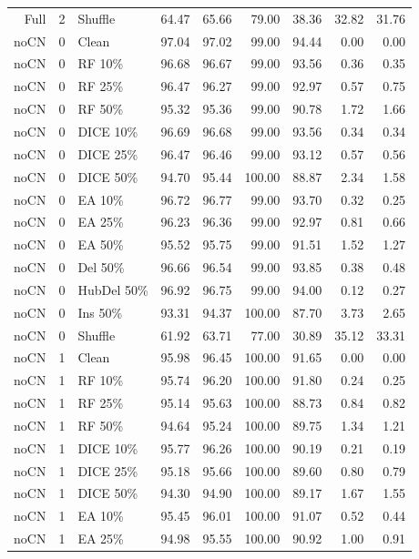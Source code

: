 {\begin{longtable}{rllrrrrrr}
Full & 2 & Shuffle & 64.47 & 65.66 & 79.00 & 38.36 & 32.82 & 31.76 \\
noCN & 0 & Clean & 97.04 & 97.02 & 99.00 & 94.44 & 0.00 & 0.00 \\
noCN & 0 & RF 10\% & 96.68 & 96.67 & 99.00 & 93.56 & 0.36 & 0.35 \\
noCN & 0 & RF 25\% & 96.47 & 96.27 & 99.00 & 92.97 & 0.57 & 0.75 \\
noCN & 0 & RF 50\% & 95.32 & 95.36 & 99.00 & 90.78 & 1.72 & 1.66 \\
noCN & 0 & DICE 10\% & 96.69 & 96.68 & 99.00 & 93.56 & 0.34 & 0.34 \\
noCN & 0 & DICE 25\% & 96.47 & 96.46 & 99.00 & 93.12 & 0.57 & 0.56 \\
noCN & 0 & DICE 50\% & 94.70 & 95.44 & 100.00 & 88.87 & 2.34 & 1.58 \\
noCN & 0 & EA 10\% & 96.72 & 96.77 & 99.00 & 93.70 & 0.32 & 0.25 \\
noCN & 0 & EA 25\% & 96.23 & 96.36 & 99.00 & 92.97 & 0.81 & 0.66 \\
noCN & 0 & EA 50\% & 95.52 & 95.75 & 99.00 & 91.51 & 1.52 & 1.27 \\
noCN & 0 & Del 50\% & 96.66 & 96.54 & 99.00 & 93.85 & 0.38 & 0.48 \\
noCN & 0 & HubDel 50\% & 96.92 & 96.75 & 99.00 & 94.00 & 0.12 & 0.27 \\
noCN & 0 & Ins 50\% & 93.31 & 94.37 & 100.00 & 87.70 & 3.73 & 2.65 \\
noCN & 0 & Shuffle & 61.92 & 63.71 & 77.00 & 30.89 & 35.12 & 33.31 \\
noCN & 1 & Clean & 95.98 & 96.45 & 100.00 & 91.65 & 0.00 & 0.00 \\
noCN & 1 & RF 10\% & 95.74 & 96.20 & 100.00 & 91.80 & 0.24 & 0.25 \\
noCN & 1 & RF 25\% & 95.14 & 95.63 & 100.00 & 88.73 & 0.84 & 0.82 \\
noCN & 1 & RF 50\% & 94.64 & 95.24 & 100.00 & 89.75 & 1.34 & 1.21 \\
noCN & 1 & DICE 10\% & 95.77 & 96.26 & 100.00 & 90.19 & 0.21 & 0.19 \\
noCN & 1 & DICE 25\% & 95.18 & 95.66 & 100.00 & 89.60 & 0.80 & 0.79 \\
noCN & 1 & DICE 50\% & 94.30 & 94.90 & 100.00 & 89.17 & 1.67 & 1.55 \\
noCN & 1 & EA 10\% & 95.45 & 96.01 & 100.00 & 91.07 & 0.52 & 0.44 \\
noCN & 1 & EA 25\% & 94.98 & 95.55 & 100.00 & 90.92 & 1.00 & 0.91 \\

\end{longtable}}

